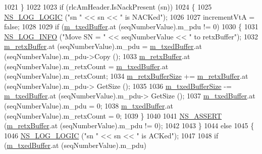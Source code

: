 \begin{DoxyCode}
1021             \}
1022 
1023           \textcolor{keywordflow}{if} (rlcAmHeader.IsNackPresent (sn))
1024             \{
1025               \hyperlink{group__logging_ga88acd260151caf2db9c0fc84997f45ce}{NS\_LOG\_LOGIC} (\textcolor{stringliteral}{"sn "} << sn << \textcolor{stringliteral}{" is NACKed"});
1026 
1027               incrementVtA = \textcolor{keyword}{false};
1028 
1029               \textcolor{keywordflow}{if} (\hyperlink{classns3_1_1LteRlcAm_afabb45c6de7da492347b45c139de0c28}{m\_txedBuffer}.at (seqNumberValue).m\_pdu != 0)
1030                 \{
1031                   \hyperlink{group__logging_gafbd73ee2cf9f26b319f49086d8e860fb}{NS\_LOG\_INFO} (\textcolor{stringliteral}{"Move SN = "} << seqNumberValue << \textcolor{stringliteral}{" to retxBuffer"});
1032                   \hyperlink{classns3_1_1LteRlcAm_ab34bb5fce080a41395ad7ea5789af8d0}{m\_retxBuffer}.at (seqNumberValue).m\_pdu = 
      \hyperlink{classns3_1_1LteRlcAm_afabb45c6de7da492347b45c139de0c28}{m\_txedBuffer}.at (seqNumberValue).m\_pdu->Copy ();
1033                   \hyperlink{classns3_1_1LteRlcAm_ab34bb5fce080a41395ad7ea5789af8d0}{m\_retxBuffer}.at (seqNumberValue).m\_retxCount = 
      \hyperlink{classns3_1_1LteRlcAm_afabb45c6de7da492347b45c139de0c28}{m\_txedBuffer}.at (seqNumberValue).m\_retxCount;
1034                   \hyperlink{classns3_1_1LteRlcAm_af270916ffd1805b027a7b9cc05c91e7d}{m\_retxBufferSize} += \hyperlink{classns3_1_1LteRlcAm_ab34bb5fce080a41395ad7ea5789af8d0}{m\_retxBuffer}.at (seqNumberValue).m\_pdu->
      GetSize ();
1035 
1036                   \hyperlink{classns3_1_1LteRlcAm_add3fe05a0fd3a4ad1fcb7db0239c698f}{m\_txedBufferSize} -= \hyperlink{classns3_1_1LteRlcAm_afabb45c6de7da492347b45c139de0c28}{m\_txedBuffer}.at (seqNumberValue).m\_pdu->
      GetSize ();
1037                   \hyperlink{classns3_1_1LteRlcAm_afabb45c6de7da492347b45c139de0c28}{m\_txedBuffer}.at (seqNumberValue).m\_pdu = 0;
1038                   \hyperlink{classns3_1_1LteRlcAm_afabb45c6de7da492347b45c139de0c28}{m\_txedBuffer}.at (seqNumberValue).m\_retxCount = 0;
1039                 \}
1040 
1041               \hyperlink{assert_8h_a6dccdb0de9b252f60088ce281c49d052}{NS\_ASSERT} (\hyperlink{classns3_1_1LteRlcAm_ab34bb5fce080a41395ad7ea5789af8d0}{m\_retxBuffer}.at (seqNumberValue).m\_pdu != 0);
1042               
1043             \}
1044           \textcolor{keywordflow}{else}
1045             \{
1046               \hyperlink{group__logging_ga88acd260151caf2db9c0fc84997f45ce}{NS\_LOG\_LOGIC} (\textcolor{stringliteral}{"sn "} << sn << \textcolor{stringliteral}{" is ACKed"});
1047 
1048               \textcolor{keywordflow}{if} (\hyperlink{classns3_1_1LteRlcAm_afabb45c6de7da492347b45c139de0c28}{m\_txedBuffer}.at (seqNumberValue).m\_pdu)

\end{DoxyCode}
